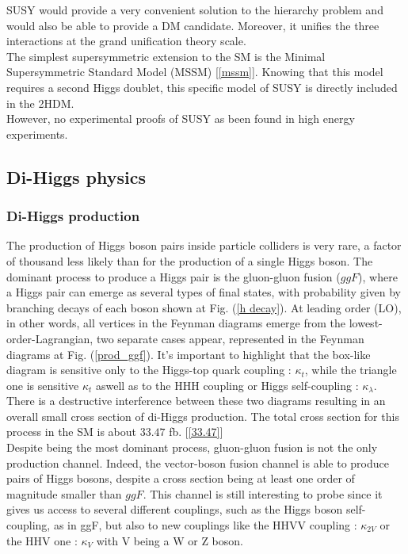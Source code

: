 \documentclass [12pt] {article}
\numberwithin{equation}{section} %
\numberwithin{figure}{section}   %
\begin{document}
SUSY would provide a very convenient solution to the hierarchy problem and would also be able to provide a DM candidate. Moreover, it unifies the three interactions at the grand unification theory scale.\\
The simplest supersymmetric extension to the SM is the Minimal Supersymmetric Standard Model (MSSM) [\ref{mssm}]. Knowing that this model requires a second Higgs doublet, this specific model of SUSY is directly included in the 2HDM.\\
However, no experimental proofs of SUSY as been found in high energy experiments.

\subsection{Di-Higgs physics}

\subsubsection*{Di-Higgs production}


The production of Higgs boson pairs inside particle colliders is very rare, a factor of thousand less likely than for the production of a single Higgs boson. The dominant process to produce a Higgs pair is the gluon-gluon fusion ($ggF$), where a Higgs pair can emerge as several types of final states, with probability given by branching decays of each boson shown at Fig. (\ref{h decay}). At leading order (LO), in other words, all vertices in the Feynman diagrams emerge from the lowest-order-Lagrangian, two separate cases appear, represented in the Feynman diagrams at Fig. (\ref{prod_ggf}). It's important to highlight that the box-like diagram is sensitive only to the Higgs-top quark coupling : $\kappa_t$, while the triangle one is sensitive $\kappa_t$ aswell as to the HHH coupling or Higgs self-coupling : $\kappa_\lambda$. There is a destructive interference between these two diagrams resulting in an overall small cross section of di-Higgs production. The total cross section for this process in the
SM is about $33.47$ fb. [\ref{33.47}]\\

Despite being the most dominant process, gluon-gluon fusion is not the only production channel. Indeed, the vector-boson fusion channel is able to produce pairs of Higgs bosons, despite a cross section being at least one order of magnitude smaller than $ggF$. This channel is still interesting to probe since it gives us access to several different couplings, such as the Higgs boson self-coupling, as in ggF, but also to new couplings like the HHVV coupling : $\kappa_{2V}$ or the HHV one : $\kappa_V$ with V being a W or Z boson.\\
\end{document}
